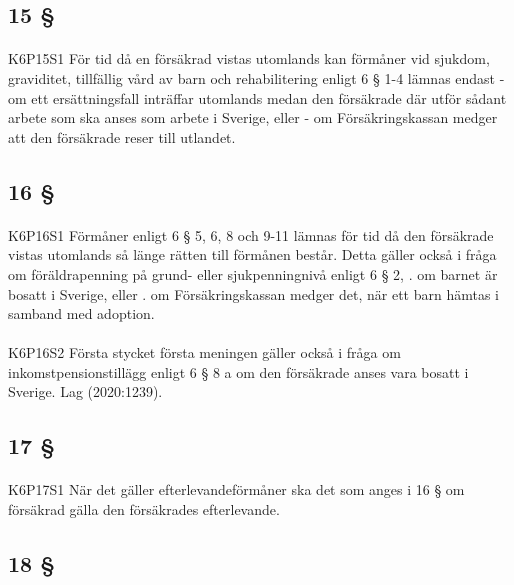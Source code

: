 \documentclass[a4paper,notitlepage,openany,10pt]{book}
\begin{document}
\subsection*{15 §}
\paragraph*{}
{\tiny K6P15S1}
För tid då en försäkrad vistas utomlands kan förmåner vid sjukdom, graviditet, tillfällig vård av barn och rehabilitering enligt 6 § 1-4 lämnas endast
\newline - om ett ersättningsfall inträffar utomlands medan den försäkrade där utför sådant arbete som ska anses som arbete i Sverige, eller
\newline - om Försäkringskassan medger att den försäkrade reser till utlandet.
\subsection*{16 §}
\paragraph*{}
{\tiny K6P16S1}
Förmåner enligt 6 § 5, 6, 8 och 9-11 lämnas för tid då den försäkrade vistas utomlands så länge rätten till förmånen består. Detta gäller också i fråga om föräldrapenning på grund- eller sjukpenningnivå enligt 6 § 2,
. om barnet är bosatt i Sverige, eller
. om Försäkringskassan medger det, när ett barn hämtas i samband med adoption.
\paragraph*{}
{\tiny K6P16S2}
Första stycket första meningen gäller också i fråga om inkomstpensionstillägg enligt 6 § 8 a om den försäkrade anses vara bosatt i Sverige.
Lag (2020:1239).
\subsection*{17 §}
\paragraph*{}
{\tiny K6P17S1}
När det gäller efterlevandeförmåner ska det som anges i 16 § om försäkrad gälla den försäkrades efterlevande.
\subsection*{18 §}
\end{document}
